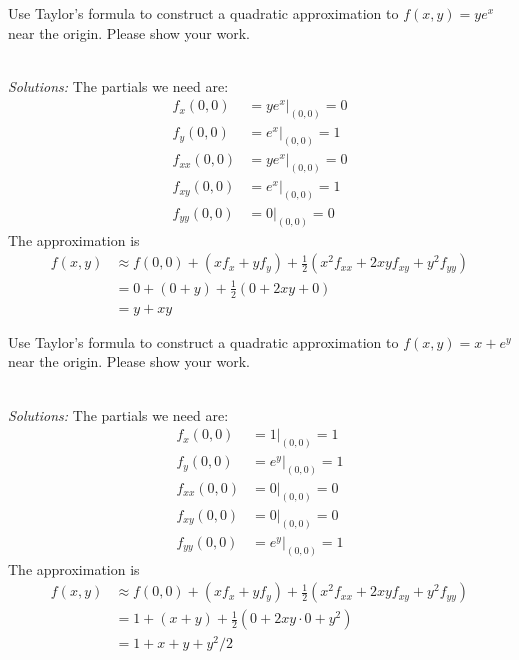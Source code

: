 \ifnum {}
\question[4] Use Taylor's formula to construct a quadratic approximation to $f(x,y) = ye^x$ near the origin. Please show your work. 
\ifnum {} {\color{DarkBlue} \\ \textit{Solutions:} The partials we need are: 
\begin{align*}
    f_x(0,0) &= ye^x\big|_{(0,0)} = 0 \\
    f_y(0,0) &= e^x \big|_{(0,0)} = 1 \\
    f_{xx}(0,0) &= ye^x\big|_{(0,0)} = 0 \\
    f_{xy}(0,0) &= e^x \big|_{(0,0)} = 1 \\    
    f_{yy}(0,0) &= 0 \big|_{(0,0)} = 0 
\end{align*}
The approximation is
\begin{align*}
    f(x,y) &\approx f(0,0) + (xf_x + yf_y) + \frac12(x^2f_{xx} + 2xyf_{xy} + y^2f_{yy}) \\ &= 0 + (0+y) + \frac12 (0+2xy+0) \\ &= y+xy 
\end{align*}

    } 
   \else
      
   \fi
    
\fi


\ifnum {}
\question[4] Use Taylor's formula to construct a quadratic approximation to $f(x,y) = x + e^y$ near the origin. Please show your work. 
\ifnum {} {\color{DarkBlue} \\ \textit{Solutions:} The partials we need are: 
\begin{align*}
    f_x(0,0) &= 1\big|_{(0,0)} = 1 \\
    f_y(0,0) &= e^y \big|_{(0,0)} = 1 \\
    f_{xx}(0,0) &= 0\big|_{(0,0)} = 0 \\
    f_{xy}(0,0) &= 0 \big|_{(0,0)} = 0 \\    
    f_{yy}(0,0) &= e^y \big|_{(0,0)} = 1
\end{align*}
The approximation is
\begin{align*}
    f(x,y) &\approx f(0,0) + (xf_x + yf_y) + \frac12(x^2f_{xx} + 2xyf_{xy} + y^2f_{yy}) 
    \\ &= 1 + (x+y) + \frac12 (0+2xy\cdot 0 +y^2) \\ &= 1 + x + y +y^2/2
\end{align*}

    } 
   \else
      
   \fi
    
\fi



